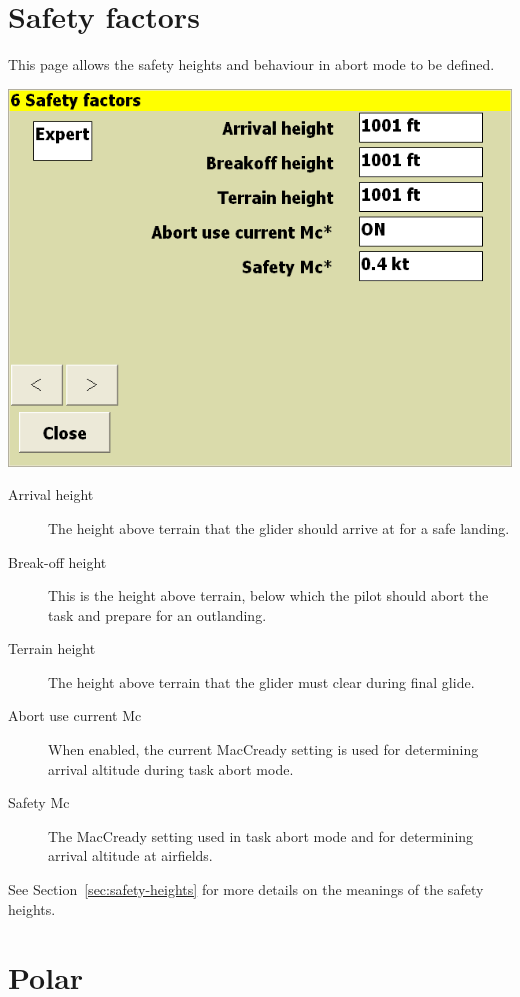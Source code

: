 \documentclass[a4paper,12pt]{refrep}
\begin{document}
\section{Safety factors}

This page allows the safety heights and behaviour in abort mode to be defined.

\begin{center}
\includegraphics[angle=0,width=\linewidth,keepaspectratio='true']{figures/config-4.png}
\end{center}

\begin{description}
\item[Arrival height]  The height above terrain that the glider
  should arrive at for a safe landing.
\item[Break-off height]  This is the height above terrain, below which
the pilot should abort the task and prepare for an outlanding.
\item[Terrain height] The height above terrain that the glider must
  clear during final glide.
\item[Abort use current Mc]  When enabled, the current MacCready setting
  is used for determining arrival altitude during task abort mode.
\item[Safety Mc]  The MacCready setting used in task abort mode and
  for determining arrival altitude at airfields. 
\end{description}
See Section~\ref{sec:safety-heights} for more details on the meanings
of the safety heights.

\clearpage
\section{Polar}
\end{document}
